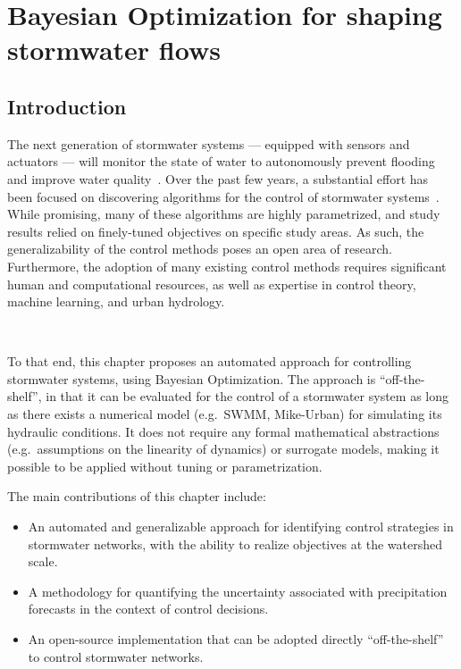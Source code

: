 \chapter{Bayesian Optimization for shaping stormwater flows}\label{ch:bayes}
\vspace{1cm}

\section{Introduction}
The next generation of stormwater systems --- equipped with sensors and actuators --- will monitor the state of water to autonomously prevent flooding and improve water quality~\cite{kerkez2016}.
Over the past few years, a substantial effort has been focused on discovering algorithms for the control of stormwater systems~\cite{Ocampo-Martinez_2015, lund2018,shishegar2018optimization}. 
While promising, many of these algorithms are highly parametrized, and study results relied on finely-tuned objectives on specific study areas.
As such, the generalizability of the control methods poses an open area of research.
Furthermore, the adoption of many existing control methods requires significant human and computational resources, as well as expertise in control theory, machine learning, and urban hydrology.

\

To that end, this chapter proposes an automated approach for controlling stormwater systems, using Bayesian Optimization.
The approach is ``off-the-shelf'', in that it can be evaluated for the control of a stormwater system as long as there exists a numerical model (e.g.\ SWMM, Mike-Urban) for simulating its hydraulic conditions.
It does not require any formal mathematical abstractions (e.g.\ assumptions on the linearity of dynamics) or surrogate models, making it possible to be applied without tuning or parametrization.

The main contributions of this chapter include:
\begin{itemize}
	\item An automated and generalizable approach for identifying control strategies in stormwater networks, with the ability to realize objectives at the watershed scale.
	\item A methodology for quantifying the uncertainty associated with precipitation forecasts in the context of control decisions.
	\item An open-source implementation that can be adopted directly ``off-the-shelf'' to control stormwater networks. 
\end{itemize}

